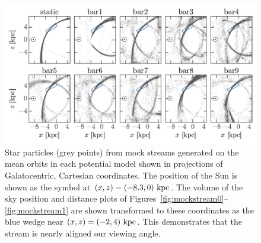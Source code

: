 \documentclass[letterpaper,12pt,preprint]{aastex}
\begin{document}
\begin{landscape}
\begin{figure}[p]
\begin{center}
\includegraphics[width=1.3\textwidth]{figures/mockstream-xyz}
\caption{ Star particles (grey points) from mock streams generated on the mean orbits in each potential model shown in projections of Galatocentric, Cartesian coordinates. The position of the Sun is shown as the symbol at $(x,z)=(-8.3,0)~{\rm kpc}$. The volume of the sky position and distance plots of Figures~\ref{fig:mockstream0}--\ref{fig:mockstream1} are shown transformed to these coordinates as the blue wedge near $(x,z)=(-2,4)~{\rm kpc}$. This demonstrates that the stream is nearly aligned our viewing angle. }
\label{fig:mockstreamxyz}
\end{center}
\end{figure}
\end{landscape}





\appendix
\end{document}
